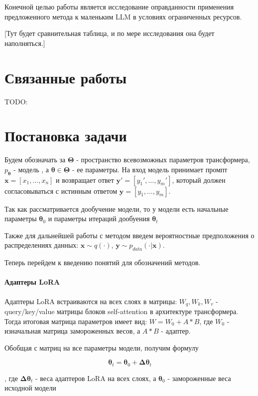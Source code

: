\documentclass[12pt, twoside]{article}
\newcommand{\bx}{\mathbf{x}}
\newcommand{\by}{\mathbf{y}}
\newcommand{\btheta}{\boldsymbol{\theta}}
\newcommand{\bTheta}{\boldsymbol{\Theta}}
\newcommand{\bDelta}{\boldsymbol{\Delta}}
\begin{document}
Конечной целью работы является исследование оправданности применения предложенного метода к маленьким LLM в условиях ограниченных ресурсов.

[Тут будет сравнительная таблица, и по мере исследования она будет наполняться.]

\vspace{10}

\section{Связанные работы}

TODO:

\vspace{10}

\section{Постановка задачи}

Будем обозначать за $\bTheta$ - пространство всевозможных параметров трансформера, $p_{\btheta}$ - модель , а $\btheta \in \bTheta$ -  ее параметры. На вход модель принимает промпт $\bx = [x_1, ..., x_n]$ и возвращает ответ $\by' = [y_1', ..., y_m']$, который должен согласовываться с истинным ответом $\by=[y_1, ..., y_m]$.

Так как рассматривается дообучение модели, то у модели есть начальные параметры $\btheta_0$ и параметры итераций дообуения $\btheta_t$

Также для дальнейшей работы с методом введем вероятностные предположения о распределениях данных: $\bx \sim q(\cdot)$,  $\by \sim p_{data}(\cdot | \bx)$. 

Теперь перейдем к введению понятий для обозначений методов.

\paragraph{Адаптеры LoRA}
Адаптеры LoRA встраиваются на всех слоях в матрицы: $W_q, W_k, W_v$ - query/key/value матрицы блоков self-attention в архитектуре трансформера. Тогда итоговая матрица параметров имеет вид: $W = W_0 + A * B$, где $W_0$ - изначальная матрица замороженных весов, а $A * B$ - адаптер.

Обобщая с матриц на все параметры модели, получим формулу 

$$\btheta_t = \btheta_0 + \bDelta\btheta_t$$

, где $\bDelta \btheta_t$ - веса адаптеров LoRA на всех слоях, а $\btheta_0$ - замороженные веса исходной модели
\end{document}
